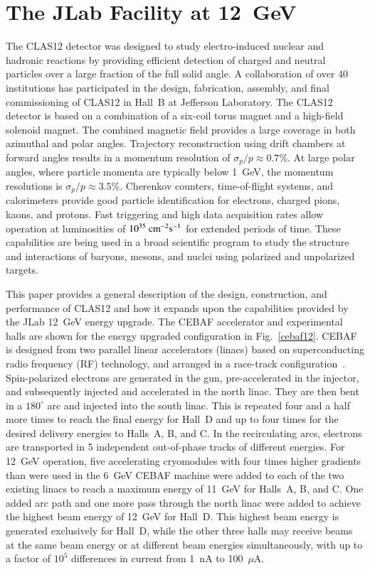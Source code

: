 \documentclass[final,3p,twocolumn]{elsarticle}
\begin{document}
\section{The JLab Facility at 12~GeV}
\label{jlab}

The CLAS12 detector was designed to study electro-induced nuclear and hadronic reactions by providing efficient
detection of charged and neutral particles over a large fraction of the full solid angle. A collaboration of over 40
institutions has participated in the design, fabrication, assembly, and final commissioning of CLAS12 in Hall~B at 
Jefferson Laboratory. The CLAS12 detector is based on a combination of a six-coil torus magnet and a high-field
solenoid magnet. The combined magnetic field provides a large coverage in both azimuthal and polar angles.
Trajectory reconstruction using drift chambers at forward angles results in a momentum resolution of
${\sigma_p / p} \approx 0.7\%$. At large polar angles, where particle momenta are typically below 1~GeV, the 
momentum resolutions is $\sigma_p / p \approx 3.5\%$. Cherenkov counters, time-of-flight systems, and
calorimeters provide good particle identification for electrons, charged pions, kaons, and protons. Fast triggering
and high data acquisition rates allow operation at luminosities of $10^{35}~\rm{cm}^{-2}\rm{s}^{-1}$ for extended
periods of time. These capabilities are being used in a broad scientific program to study the structure and
interactions of baryons, mesons, and nuclei using polarized and unpolarized targets. 



This paper provides a general description of the design, construction, and performance of CLAS12 and how it expands
upon the capabilities provided by the JLab 12~GeV energy upgrade. The CEBAF accelerator and experimental halls
are shown for the energy upgraded configuration in Fig.~\ref{cebaf12}. CEBAF is designed from two parallel linear
accelerators (linacs) based on superconducting radio frequency (RF) technology, and arranged in a race-track
configuration~\cite{Leemann:2001dg}. Spin-polarized electrons are generated in the gun, pre-accelerated in the
injector, and subsequently injected and accelerated in the north linac. They are then bent in a $180^\circ$ arc and
injected into the south linac. This is repeated four and a half more times to reach the final energy for Hall~D and up to
four times  for the desired delivery energies to Halls~A, B, and C. In the recirculating arcs, electrons are transported
in 5 independent out-of-phase tracks of different energies. For 12~GeV operation, five accelerating cryomodules with
four times higher gradients than were used in the 6~GeV CEBAF machine were added to each of the two existing linacs
to reach a maximum energy of 11~GeV for Halls~A, B, and C. One added arc path and one more pass through the north
linac were added to achieve the highest beam energy of 12~GeV for Hall~D. This highest beam energy is generated
exclusively for Hall~D, while the other three halls may receive beams at the same beam energy or at different beam
energies simultaneously, with up to a factor of $10^5$ differences in current from 1~nA to 100~$\mu$A.
\end{document}
